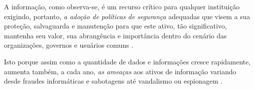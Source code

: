 A informação, como observa-se, é um recurso crítico para qualquer instituição exigindo, portanto, \textit{a adoção de políticas de segurança} adequadas que visem a sua proteção, salvaguarda e manutenção para que este ativo, tão significativo, mantenha seu valor, sua abrangência e importância dentro do cenário das organizações, governos e usuários comuns \cite{marciano_segurancda_nodate}. 

Isto porque assim como a quantidade de dados e informações cresce rapidamente, aumenta também, a cada ano, \textit{as ameaças} aos ativos de informação variando desde fraudes informáticas e sabotagens até vandalismo ou espionagem \cite{casaca_porque_2013}.



